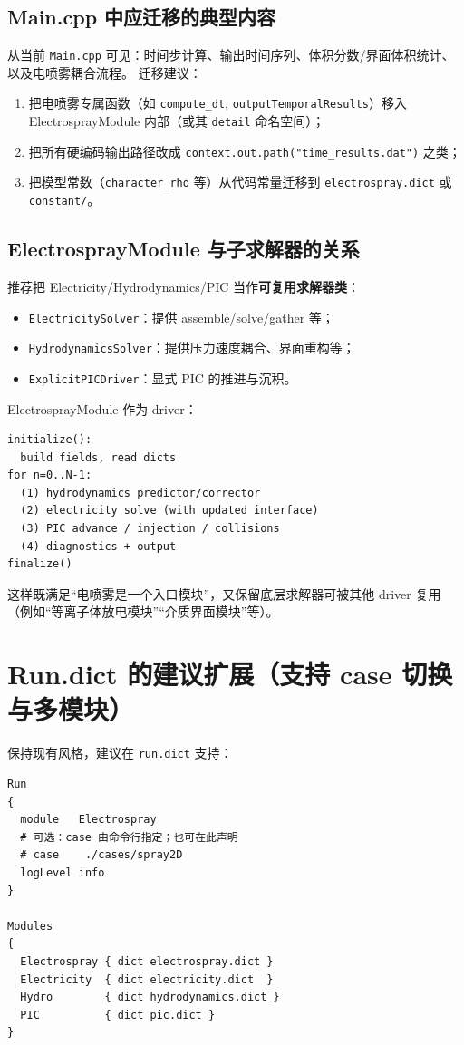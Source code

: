 \documentclass[UTF8,a4paper,11pt]{ctexart}
\begin{document}
\subsection{Main.cpp 中应迁移的典型内容}
从当前 \texttt{Main.cpp} 可见：时间步计算、输出时间序列、体积分数/界面体积统计、以及电喷雾耦合流程。
迁移建议：
\begin{enumerate}[label=\arabic*)]
  \item 把电喷雾专属函数（如 \texttt{compute\_dt}, \texttt{outputTemporalResults}）移入 ElectrosprayModule 内部（或其 \texttt{detail} 命名空间）；
  \item 把所有硬编码输出路径改成 \texttt{context.out.path("time\_results.dat")} 之类；
  \item 把模型常数（\texttt{character\_rho} 等）从代码常量迁移到 \texttt{electrospray.dict} 或 \texttt{constant/}。
\end{enumerate}

\subsection{ElectrosprayModule 与子求解器的关系}
推荐把 Electricity/Hydrodynamics/PIC 当作\textbf{可复用求解器类}：
\begin{itemize}
  \item \texttt{ElectricitySolver}：提供 assemble/solve/gather 等；
  \item \texttt{HydrodynamicsSolver}：提供压力速度耦合、界面重构等；
  \item \texttt{ExplicitPICDriver}：显式 PIC 的推进与沉积。
\end{itemize}

ElectrosprayModule 作为 driver：
\begin{lstlisting}
initialize():
  build fields, read dicts
for n=0..N-1:
  (1) hydrodynamics predictor/corrector
  (2) electricity solve (with updated interface)
  (3) PIC advance / injection / collisions
  (4) diagnostics + output
finalize()
\end{lstlisting}

这样既满足“电喷雾是一个入口模块”，又保留底层求解器可被其他 driver 复用（例如“等离子体放电模块”“介质界面模块”等）。

\section{Run.dict 的建议扩展（支持 case 切换与多模块）}

保持现有风格，建议在 \texttt{run.dict} 支持：
\begin{lstlisting}
Run
{
  module   Electrospray
  # 可选：case 由命令行指定；也可在此声明
  # case    ./cases/spray2D
  logLevel info
}

Modules
{
  Electrospray { dict electrospray.dict }
  Electricity  { dict electricity.dict  }
  Hydro        { dict hydrodynamics.dict }
  PIC          { dict pic.dict }
}
\end{lstlisting}
\end{document}
